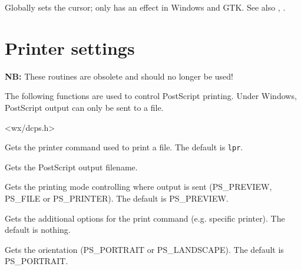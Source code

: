\label{wxsetcursor}


Globally sets the cursor; only has an effect in Windows and GTK.
See also , .



\section{Printer settings}\label{printersettings}

{\bf NB:} These routines are obsolete and should no longer be used!

The following functions are used to control PostScript printing. Under
Windows, PostScript output can only be sent to a file.


<wx/dcps.h>


\label{wxgetprintercommand}


Gets the printer command used to print a file. The default is {\tt lpr}.


\label{wxgetprinterfile}


Gets the PostScript output filename.


\label{wxgetprintermode}


Gets the printing mode controlling where output is sent (PS\_PREVIEW, PS\_FILE or PS\_PRINTER).
The default is PS\_PREVIEW.


\label{wxgetprinteroptions}


Gets the additional options for the print command (e.g. specific printer). The default is nothing.


\label{wxgetprinterorientation}


Gets the orientation (PS\_PORTRAIT or PS\_LANDSCAPE). The default is PS\_PORTRAIT.


